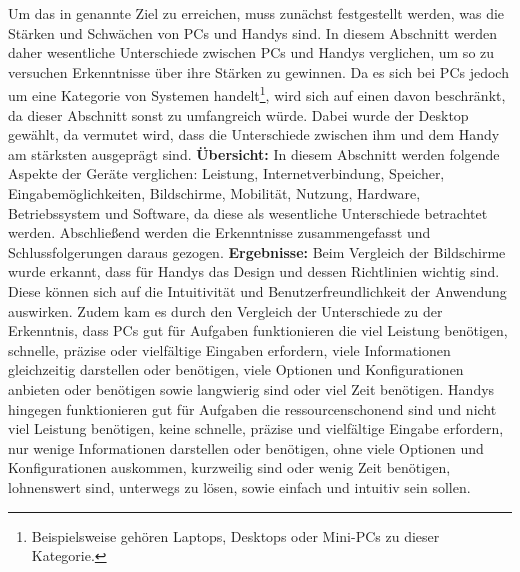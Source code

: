 %
%
	Um das in  genannte Ziel zu erreichen, muss zunächst festgestellt werden, was die Stärken und Schwächen von PCs und Handys sind. %
	In diesem Abschnitt werden daher wesentliche Unterschiede zwischen PCs und Handys verglichen, um so zu versuchen Erkenntnisse über ihre Stärken zu gewinnen. %
	Da es sich bei PCs jedoch um eine Kategorie von Systemen handelt\footnote{Beispielsweise gehören Laptops, Desktops oder Mini-PCs zu dieser Kategorie.}, wird sich auf einen davon beschränkt, da dieser Abschnitt sonst zu umfangreich würde. Dabei wurde der Desktop gewählt, da vermutet wird, dass die Unterschiede zwischen ihm und dem Handy am stärksten ausgeprägt sind. \newline%
\textbf{Übersicht:} %
	In diesem Abschnitt werden folgende Aspekte der Geräte verglichen: Leistung, Internetverbindung, Speicher, Eingabemöglichkeiten, Bildschirme, Mobilität, Nutzung, Hardware, Betriebssystem und Software, da diese als wesentliche Unterschiede betrachtet werden. %
	Abschließend werden die Erkenntnisse zusammengefasst und Schlussfolgerungen daraus gezogen.\newline%
\textbf{Ergebnisse:} %
	Beim Vergleich der Bildschirme wurde erkannt, dass für Handys das Design und dessen Richtlinien wichtig sind. Diese können sich auf die Intuitivität und Benutzerfreundlichkeit der Anwendung auswirken.\newline%
	Zudem kam es durch den Vergleich der Unterschiede zu der Erkenntnis, dass PCs gut für Aufgaben funktionieren %
		die viel Leistung benötigen, schnelle, präzise oder vielfältige Eingaben erfordern, viele Informationen gleichzeitig darstellen oder benötigen, viele Optionen und Konfigurationen anbieten oder benötigen sowie langwierig sind oder viel Zeit benötigen.\newline
	Handys hingegen funktionieren gut für Aufgaben %
		die ressourcenschonend sind und nicht viel Leistung benötigen, keine schnelle, präzise und vielfältige Eingabe erfordern, nur wenige Informationen darstellen oder benötigen, ohne viele Optionen und Konfigurationen auskommen, kurzweilig sind oder wenig Zeit benötigen, lohnenswert sind, unterwegs zu lösen, sowie einfach und intuitiv sein sollen.%